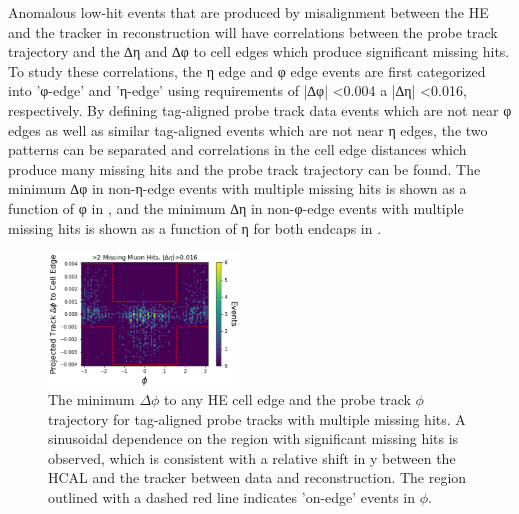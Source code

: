 Anomalous low-hit events that are produced by misalignment between the HE and the tracker in reconstruction will have correlations between the probe track trajectory and the ∆η and ∆φ to cell edges which produce significant missing hits. 
To study these correlations, the η edge and φ edge events are first categorized into ’φ-edge’ and ’η-edge’ using requirements of |∆φ| <0.004 a |∆η| <0.016, respectively. 
By defining tag-aligned probe track data events which are not near φ edges as well as similar tag-aligned events which are not near η edges, the two patterns can be separated and correlations in the cell edge distances which produce many missing hits and the probe track trajectory can be found. 
The minimum ∆φ in non-η-edge events with multiple missing hits is shown as a function of φ in , and the minimum ∆η in non-φ-edge events with multiple missing hits is shown as a function of η for both endcaps in .

\begin{figure}[htpb]
    \includegraphics[width=0.45\textwidth]{figures/phiEdgeEventsData.png} 
    \centering
	\caption[$\phi$ edge correlations in missing HCAL muon hits.]{The minimum $\Delta\phi$ to any HE cell edge and the probe track $\phi$ trajectory for tag-aligned probe tracks with multiple missing hits. A sinusoidal dependence on the region with significant missing hits is observed, which is consistent with a relative shift in y between the HCAL and the tracker between data and reconstruction. The region outlined with a dashed red line indicates 'on-edge' events in $\phi$.}
    \label{fig:phiEdgeCorr}
\end{figure}

